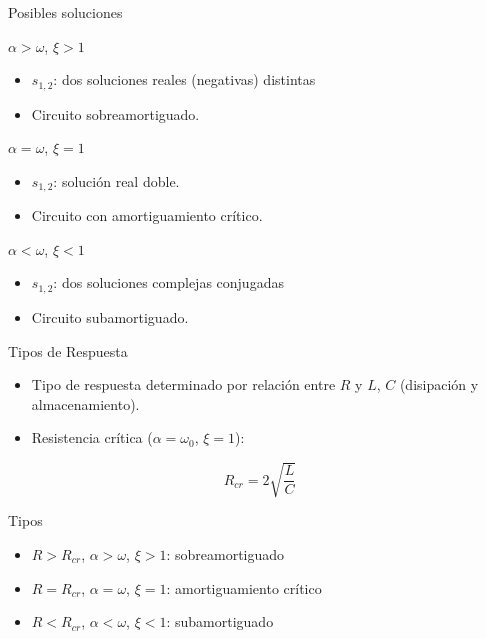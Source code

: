 \documentclass[aspectratio=169, usenames,svgnames,dvipsnames]{beamer}
\begin{document}
\begin{frame}[label={sec:orgcebc1b4}]{Posibles soluciones}
\begin{block}{\(\alpha > \omega\), \(\xi > 1\)}
\begin{itemize}
\item \(s_{1,2}\): dos soluciones reales (negativas) distintas
\item Circuito \alert{sobreamortiguado}.
\end{itemize}
\end{block}

\begin{block}{\(\alpha = \omega\), \(\xi = 1\)}
\begin{itemize}
\item \(s_{1,2}\): solución real doble.
\item Circuito con \alert{amortiguamiento crítico}.
\end{itemize}
\end{block}

\begin{block}{\(\alpha < \omega\), \(\xi < 1\)}
\begin{itemize}
\item \(s_{1,2}\): dos soluciones complejas conjugadas
\item Circuito \alert{subamortiguado}.
\end{itemize}
\end{block}
\end{frame}

\begin{frame}[label={sec:orgf8eb64a}]{Tipos de Respuesta}
\begin{itemize}
\item Tipo de respuesta determinado por relación entre \(R\) y \(L\), \(C\) (disipación y almacenamiento).
\item Resistencia crítica (\(\alpha = \omega_0\), \(\xi = 1\)):
\end{itemize}

\[
  R_{cr} = 2\sqrt{\frac{L}{C}}
\]

\begin{block}{Tipos}
\begin{itemize}
\item \(R > R_{cr}\), \(\alpha > \omega\), \(\xi > 1\): \alert{sobreamortiguado}
\item \(R = R_{cr}\),  \(\alpha = \omega\), \(\xi = 1\): \alert{amortiguamiento crítico}
\item \(R < R_{cr}\),  \(\alpha < \omega\), \(\xi < 1\): \alert{subamortiguado}
\end{itemize}
\end{block}
\end{frame}
\end{document}

